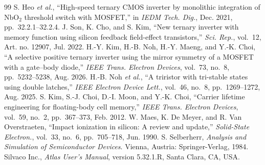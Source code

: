 \documentclass[journal]{IEEEtran}
\begin{document}
\begin{thebibliography}{99}
 S. Heo \emph{et al.}, ``High-speed ternary CMOS inverter by monolithic integration of NbO$_2$ threshold switch with MOSFET,'' in \emph{IEDM Tech. Dig.}, Dec. 2021, pp.~32.2.1--32.2.4.
 J. Son, K. Cho, and S. Kim, ``New ternary inverter with memory function using silicon feedback field-effect transistors,'' \emph{Sci. Rep.}, vol.~12, Art. no. 12907, Jul. 2022.
 H.-Y. Kim, H.-B. Noh, H.-Y. Maeng, and Y.-K. Choi, ``A selective positive ternary inverter using the mirror symmetry of a MOSFET with a gate--body diode,'' \emph{IEEE Trans. Electron Devices}, vol.~73, no.~8, pp.~5232--5238, Aug. 2026.
 H.-B. Noh \emph{et al.}, ``A triristor with tri-stable states using double latches,'' \emph{IEEE Electron Device Lett.}, vol.~46, no.~8, pp.~1269--1272, Aug. 2025.
 S. Kim, S.-J. Choi, D.-I. Moon, and Y.-K. Choi, ``Carrier lifetime engineering for floating-body cell memory,'' \emph{IEEE Trans. Electron Devices}, vol.~59, no.~2, pp.~367--373, Feb. 2012.
 W. Maes, K. De Meyer, and R. Van Overstraeten, ``Impact ionization in silicon: A review and update,'' \emph{Solid-State Electron.}, vol.~33, no.~6, pp.~705--718, Jun. 1990.
 S. Selberherr, \emph{Analysis and Simulation of Semiconductor Devices}. Vienna, Austria: Springer-Verlag, 1984.
 Silvaco Inc., \emph{Atlas User's Manual}, version 5.32.1.R, Santa Clara, CA, USA.
\end{thebibliography}
\end{document}
